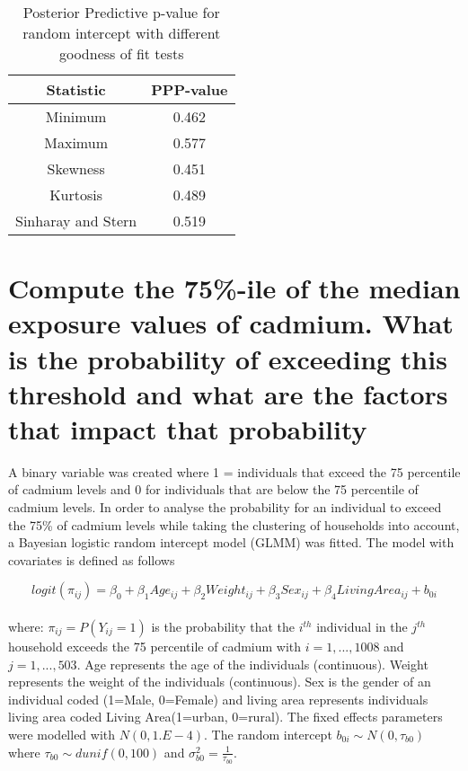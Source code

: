 \documentclass[11pt]{article}
\begin{document}
\begin{table}[H]
\centering
\caption{Posterior Predictive p-value for random intercept with different goodness of fit tests}
\label{tab:PPC_HLR}
\begin{tabular}{@{}cc@{}}
\toprule
\textbf{Statistic} & \textbf{PPP-value} \\ \midrule
Minimum & 0.462 \\
Maximum & 0.577 \\
Skewness & 0.451 \\
Kurtosis & 0.489 \\
Sinharay and Stern & 0.519 \\ \bottomrule
\end{tabular}
\end{table}

\newpage

\section{Compute the 75\%-ile of the median exposure values of cadmium. What is the probability of exceeding this threshold and what are the factors that impact that probability}


A binary variable was created where 1 = individuals that exceed the 75 percentile of cadmium levels and 0 for individuals that are below the 75 percentile of cadmium levels. In order to analyse the probability for an individual to exceed the 75\% of cadmium levels while taking the clustering of households into account, a Bayesian logistic random intercept model (GLMM) was fitted. The model with covariates is defined as follows

$$logit(\pi_{ij}) = \beta_{0} +  \beta_{1}Age_{ij} + \beta_{2}Weight_{ij} + \beta_{3}Sex_{ij} +\beta_{4}Living Area_{ij} + b_{0i} $$
\\
where: $\pi_{ij} = P(Y_{ij}=1)$ is the probability that the $i^{th}$ individual in the $j^{th}$ household  exceeds the 75 percentile of cadmium with $i=1,...,1008$ and $j=1,...,503$. Age represents the age of the individuals (continuous). Weight represents the weight of the individuals (continuous). Sex is the gender of an individual coded (1=Male, 0=Female) and living area represents individuals living area coded Living Area(1=urban, 0=rural). The fixed effects parameters were modelled with $N(0,1.E-4)$. The random intercept $b_{0i} \sim N(0,\tau_{b0})$ where $\tau_{b0} \sim dunif(0,100)$ and $\sigma_{b0}^{2} = \frac{1}{\tau_{b0}}$. 
\end{document}
